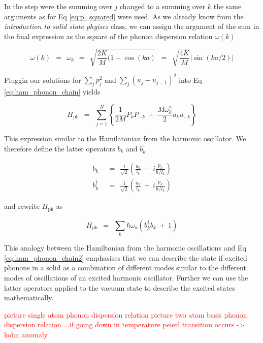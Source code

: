\documentclass[10pt]{report}
\numberwithin{equation}{chapter}
\newcommand{\refEq}[1]{
  Eq  \ref{#1}
}
\begin{document}
In the step were the summing over $j$ changed to a summing over $k$ the same arguments as for \refEq{eq:p_squared} were used. As we already know from the \textit{introduction to solid state phyiscs} class, we can assign the argument of the sum in the final expression as the square of the phonon dispersion relation $\omega(k)$

\begin{equation}\label{eq:dispersion_relation}
  \omega(k) ~~=~~ \omega_k ~~=~~  \sqrt{\frac{2K}{M}(1-\cos(ka)} ~~=~~ 
  \sqrt{\frac{4K}{M}} |\sin(ka/2)|
\end{equation}

Pluggin our solutions for $\sum_j p_j^2$ and $\sum_j (u_j-u_{j-1})^2$ into \refEq{eq:ham_phonon_chain} yields

\begin{equation}\label{eq:ham_phonon_chain2}
  H_\text{ph} ~~=~~ \sum_{j=1}^N \left\{ \frac{1}{2M} P_k P_{-k} ~+~ \frac{M \omega_k^2}{2} u_k u_{-k} \right\} 
\end{equation}

This expression similar to the Hamilatonian from the harmonic oscillator. We therefore define the latter operators $b_k$ and $b_k^\dag$

\begin{align}
  b_k ~~& =~~ \frac{1}{\sqrt{2}} \left( \frac{u_k}{l_k} ~+~ i \frac{p_k}{\hbar/l_k} \right)\\
  b_k^\dag ~~& =~~ \frac{1}{\sqrt{2}} \left( \frac{u_k}{l_k} ~-~ i\frac{p_k}{\hbar/l_k} \right)
\end{align}

and rewrite $H_\text{ph}$ as 

\begin{equation}
  H_\text{ph} ~~=~~ \sum_k \hbar \omega_k (b^\dag_k b_k ~+~ 1)
\end{equation}

This analogy between the Hamiltonian from the harmonic oscillations and \refEq{eq:ham_phonon_chain2} emphasises that we can describe the state if excited phonons in a solid as a combination of different modes similar to the different modes of oscillations of an excited harmonic oscillator. Further we can use the latter operators applied to the vacuum state to describe the excited states mathematically.

\textcolor{red}{picture single atom phonon dispersion relation}
\textcolor{red}{picture two atom basis phonon dispersion relation}
\textcolor{red}{...if going down in temperature peierl transition occurs -> kohn anomaly}
\end{document}
